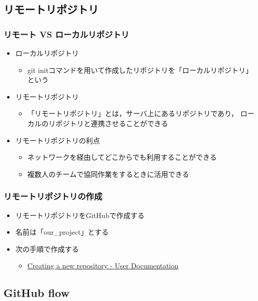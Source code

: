 \documentclass[a4paper,twoside,twocolumn]{bxjsarticle}
\begin{document}
\subsection{リモートリポジトリ}
\label{sec-2-2}
\subsubsection{リモート VS ローカルリポジトリ}
\label{sec-2-2-1}
\begin{itemize}
\item ローカルリポジトリ
\begin{itemize}
\item git initコマンドを用いて作成したリポジトリを「ローカルリポジトリ」という
\end{itemize}
\item リモートリポジトリ
\begin{itemize}
\item 「リモートリポジトリ」とは，サーバ上にあるリポジトリであり，
ローカルのリポジトリと連携させることができる
\end{itemize}
\item リモートリポジトリの利点
\begin{itemize}
\item ネットワークを経由してどこからでも利用することができる
\item 複数人のチームで協同作業をするときに活用できる
\end{itemize}
\end{itemize}
\subsubsection{リモートリポジトリの作成}
\label{sec-2-2-2}
\begin{itemize}
\item リモートリポジトリをGitHubで作成する
\item 名前は「our\_project」とする
\item 次の手順で作成する
\begin{itemize}
\item \href{https://help.github.com/articles/creating-a-new-repository/}{Creating a new repository - User Documentation}
\end{itemize}
\end{itemize}

\subsection{GitHub flow}
\label{sec-2-3}
\end{document}

